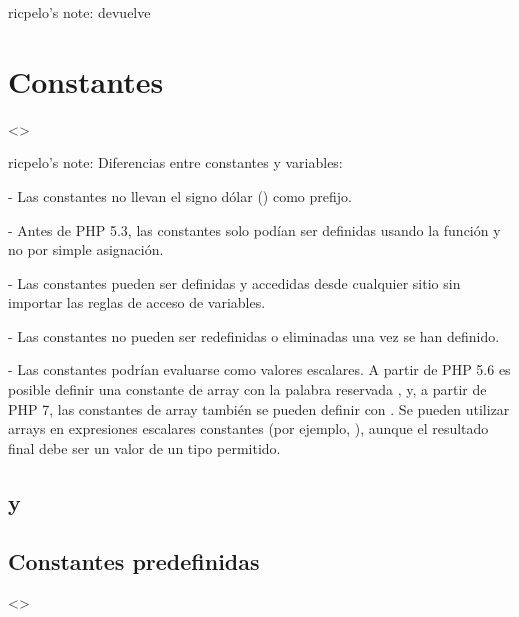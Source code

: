 \documentclass[a4paper,12pt,spanish]{sphinxmanual}
\begin{document}
ricpelo’s note:  devuelve 


\section{Constantes}
\label{\detokenize{php:constantes}}
\textless{}\textgreater{}

\begin{DUlineblock}{0em}
\item[] ricpelo’s note: Diferencias entre constantes y variables:
\item[] - Las constantes no llevan el signo dólar (\sphinxcode{\sphinxupquote{\$}}) como prefijo.
\item[] - Antes de PHP 5.3, las constantes solo podían ser definidas usando la
función  y no por simple asignación.
\item[] - Las constantes pueden ser definidas y accedidas desde cualquier
sitio sin importar las reglas de acceso de variables.
\item[] - Las constantes no pueden ser redefinidas o eliminadas una vez se han
definido.
\item[] - Las constantes podrían evaluarse como valores escalares. A partir de
PHP 5.6 es posible definir una constante de array con la palabra
reservada , y, a partir de PHP 7, las constantes de array
también se pueden definir con . Se pueden utilizar arrays
en expresiones escalares constantes (por ejemplo,
), aunque el resultado final debe ser
un valor de un tipo permitido.
\end{DUlineblock}


\subsection{ y }
\label{\detokenize{php:define-y-const}}

\subsection{Constantes predefinidas}
\label{\detokenize{php:constantes-predefinidas}}
\textless{}\textgreater{}
\end{document}
